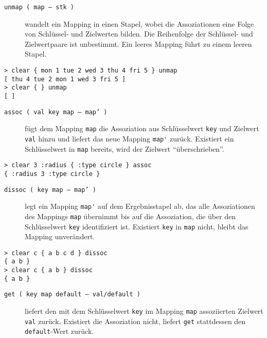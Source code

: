 \begin{description}
\item[\texttt{unmap ( map -- stk )}] wandelt ein Mapping in einen Stapel, wobei die Assoziationen eine Folge von Schlüssel- und Zielwerten bilden. Die Reihenfolge der Schlüssel- und Zielwertpaare ist unbestimmt. Ein leeres Mapping führt zu einem leeren Stapel.
\end{description}

\begin{verbatim}
> clear { mon 1 tue 2 wed 3 thu 4 fri 5 } unmap
[ thu 4 tue 2 mon 1 wed 3 fri 5 ]
> clear { } unmap
[ ]
\end{verbatim}

\begin{description}
\item[\texttt{assoc ( val key map -- map' )}] fügt dem Mapping \verb|map| die Assoziation aus Schlüsselwert \verb|key| und Zielwert \verb|val| hinzu und liefert das neue Mapping \verb|map'| zurück. Existiert ein Schlüsselwert in \verb|map| bereits, wird der Zielwert "`über\-schrie\-ben"'.
\end{description}

\begin{verbatim}
> clear 3 :radius { :type circle } assoc
{ :radius 3 :type circle }
\end{verbatim}

\begin{description}
\item[\texttt{dissoc ( key map -- map' )}] legt ein Mapping \verb|map'| auf dem Ergebnisstapel ab, das alle Assoziationen des Mappings \verb|map| übernimmt bis auf die Assoziation, die über den Schlüsselwert \verb|key| identifiziert ist. Existiert \verb|key| in \verb|map| nicht, bleibt das Mapping unverändert.
\end{description}

\begin{verbatim}
> clear c { a b c d } dissoc
{ a b }
> clear c { a b } dissoc
{ a b }
\end{verbatim}

\begin{description}
\item[\texttt{get ( key map default -- val/default )}] liefert den mit dem Schlüsselwert \verb|key| im Mapping \verb|map| assoziierten Zielwert \verb|val| zurück. Existiert die Assoziation nicht, liefert \verb|get| stattdessen den \verb|default|-Wert zurück.
\end{description}

